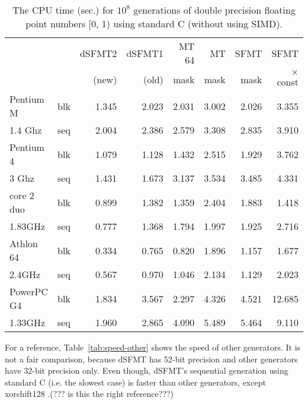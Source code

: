\documentclass{svmult}
\begin{document}
\begin{table}
  \begin{center}
    \begin{tabular}{|ll|r|r|r|r|r|r|} \hline
      &  & dSFMT2 & dSFMT1 & MT 64 & MT & SFMT & SFMT \\
      &  &(new)&(old)& mask & mask & mask & $\times$ const \\ \hline\hline
      Pentium M & blk & 1.345 & 2.023 & 2.031 & 3.002 & 2.026 & 3.355 \\
      1.4 Ghz & seq & 2.004 & 2.386 & 2.579 & 3.308 & 2.835 & 3.910 \\ \hline
      Pentium 4 & blk & 1.079 & 1.128 & 1.432 & 2.515 & 1.929 & 3.762 \\
      3 Ghz & seq & 1.431 & 1.673 & 3.137 & 3.534 & 3.485 & 4.331 \\ \hline
      core 2 duo & blk & 0.899 & 1.382 & 1.359 & 2.404 & 1.883 & 1.418 \\
      1.83GHz & seq & 0.777 & 1.368 & 1.794 & 1.997 & 1.925 & 2.716 \\ \hline
      Athlon 64 & blk & 0.334 & 0.765 & 0.820 & 1.896 & 1.157 & 1.677 \\
      2.4GHz & seq & 0.567 & 0.970 & 1.046 & 2.134 & 1.129 & 2.023 \\ \hline
      PowerPC G4 & blk & 1.834 & 3.567 & 2.297 & 4.326 & 4.521 & 12.685 \\
      1.33GHz & seq & 1.960 & 2.865 & 4.090 & 5.489 & 5.464 & 9.110 \\ \hline
    \end{tabular}
    \caption{The CPU time (sec.) for $10^8$ generations of double precision
      floating point numbers [0, 1) using standard C (without using SIMD).}
    \label{tab:speed-c}
  \end{center}
\end{table}

For a reference, Table~\ref{tab:speed-other} shows the speed of other
generators. It is not a fair comparison, 
because dSFMT has 52-bit precision and other generators have 32-bit
precision only. Even though, dSFMT's sequential generation using standard
C (i.e. the slowest case) is faster than other generators, except xorshift128
\cite{XORSHIFT}.(??? is this the right reference???)
\end{document}
